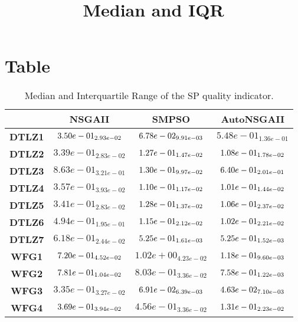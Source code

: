 \documentclass{article}
\title{Median and IQR}
\author{}
\begin{document}
\maketitle
\section{Table}
\begin{table}[!htp]
  \caption{Median and Interquartile Range of the SP quality indicator.}
  \label{table:SP}
  \centering
  \begin{scriptsize}
  \begin{tabular}{c|ccc}
      & \textbf{NSGAII} & \textbf{SMPSO} & \textbf{AutoNSGAII} \\\hline
      \textbf{DTLZ1} & $\cellcolor{gray25} 3.50e-01_{2.93e-02} $ & $ \cellcolor{gray95} 6.78e-02_{9.91e-03} $ & $ 5.48e-01_{1.36e-01}$ \\
      \textbf{DTLZ2} & $3.39e-01_{2.83e-02} $ & $ \cellcolor{gray25} 1.27e-01_{1.47e-02} $ & $ \cellcolor{gray95} 1.08e-01_{1.78e-02}$ \\
      \textbf{DTLZ3} & $8.63e-01_{3.21e-01} $ & $ \cellcolor{gray95} 1.30e-01_{9.97e-02} $ & $ \cellcolor{gray25} 6.40e-01_{2.01e-01}$ \\
      \textbf{DTLZ4} & $3.57e-01_{3.93e-02} $ & $ \cellcolor{gray25} 1.10e-01_{1.17e-02} $ & $ \cellcolor{gray95} 1.01e-01_{1.44e-02}$ \\
      \textbf{DTLZ5} & $3.41e-01_{2.83e-02} $ & $ \cellcolor{gray25} 1.28e-01_{1.37e-02} $ & $ \cellcolor{gray95} 1.06e-01_{2.37e-02}$ \\
      \textbf{DTLZ6} & $4.94e-01_{1.95e-01} $ & $ \cellcolor{gray25} 1.15e-01_{2.12e-02} $ & $ \cellcolor{gray95} 1.02e-01_{2.21e-02}$ \\
      \textbf{DTLZ7} & $6.18e-01_{2.44e-02} $ & $ \cellcolor{gray25} 5.25e-01_{1.61e-03} $ & $ \cellcolor{gray95} 5.25e-01_{1.52e-03}$ \\
      \textbf{WFG1} & $\cellcolor{gray25} 7.20e-01_{4.52e-02} $ & $ 1.02e+00_{4.23e-02} $ & $ \cellcolor{gray95} 1.18e-01_{9.60e-03}$ \\
      \textbf{WFG2} & $\cellcolor{gray25} 7.81e-01_{1.04e-02} $ & $ 8.03e-01_{3.36e-02} $ & $ \cellcolor{gray95} 7.58e-01_{1.22e-03}$ \\
      \textbf{WFG3} & $3.35e-01_{3.27e-02} $ & $ \cellcolor{gray25} 6.91e-02_{6.39e-03} $ & $ \cellcolor{gray95} 4.63e-02_{7.10e-03}$ \\
      \textbf{WFG4} & $\cellcolor{gray25} 3.69e-01_{3.94e-02} $ & $ 4.56e-01_{3.36e-02} $ & $ \cellcolor{gray95} 1.31e-01_{2.23e-02}$ \\

\end{tabular}
\end{scriptsize}
\end{table}
\end{document}
